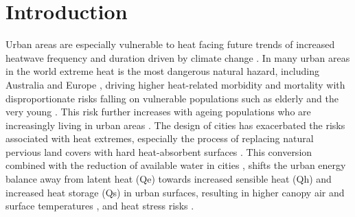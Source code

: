 \documentclass[final,3p,times,authoryear]{elsarticle}
\begin{document}
\maketitle

\section{Introduction}\label{sec:introduction}

Urban areas are especially vulnerable to heat facing future trends of increased heatwave frequency and duration \citep{Cowan2014,Perkins-Kirkpatrick2020} driven by climate change \citep{IPCC2022}. In many urban areas in the world extreme heat is the most dangerous natural hazard, including Australia \citep{Coates2014} and Europe \citep{Forzieri2017}, driving higher heat-related morbidity and mortality \citep{Heidari2020} with disproportionate risks falling on vulnerable populations such as elderly and the very young \citep{Nicholls2008,Wilson2011a}. This risk further increases with ageing populations who are increasingly living in urban areas \citep{ABS2008}. The design of cities has exacerbated the risks associated with heat extremes, especially the process of replacing natural pervious land covers with hard heat-absorbent surfaces \citep{Brunner2013}. This conversion combined with the reduction of available water in cities \citep{Spronken-Smith2010,Coutts2012,Middel2019a,Cheung2022b}, shifts the urban energy balance \citep{Oke1982,Oke1989} away from latent heat (\gls{Qe}) towards increased sensible heat (\gls{Qh}) and increased heat storage (\gls{Qs}) in urban surfaces, resulting in higher canopy air and surface temperatures \citep{Coutts2012,Martilli2020,Nice2022a}, and heat stress risks \citep{Nicholls2008,Loughnan2010,Nazarian2022}.
\end{document}
